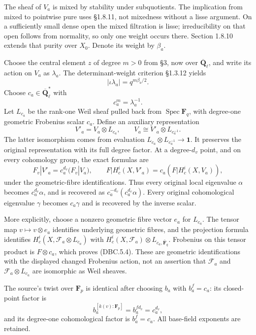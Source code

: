 \documentclass[
]{report}
\begin{document}
The sheaf of \(V_a\) is mixed by stability under subquotients. The
implication from mixed to pointwise pure uses §1.8.11, not mixedness
without a lisse argument. On a sufficiently small dense open the mixed
filtration is lisse; irreducibility on that open follows from normality,
so only one weight occurs there. Section 1.8.10 extends that purity over
\(X_0\). Denote its weight by \(\beta_a\).

Choose the central element \(z\) of degree \(m>0\) from §3, now over
\(\overline{\mathbf Q}_\ell\), and write its action on \(V_a\) as
\(\lambda_a\). The determinant-weight criterion §1.3.12 yields \[
|\iota\lambda_a|=q^{m\beta_a/2}.
\tag{DBC.5.1}
\] Choose \(c_a\in\overline{\mathbf Q}_\ell^*\) with \[
c_a^m=\lambda_a^{-1}.
\tag{DBC.5.2}
\] Let \(L_{c_a}\) be the rank-one Weil sheaf pulled back from
\(\operatorname{Spec}\mathbf F_q\), with degree-one geometric Frobenius
scalar \(c_a\). Define an auxiliary representation \[
V'_a=V_a\otimes L_{c_a},\qquad
V_a\cong V'_a\otimes L_{c_a^{-1}}.
\tag{DBC.5.3}
\] The latter isomorphism comes from evaluation
\(L_{c_a}\otimes L_{c_a^{-1}}\to\mathbf1\). It preserves the original
representation with its full degree factor. At a degree-\(d_v\) point,
and on every cohomology group, the exact formulas are \[
F_v|V'_a=c_a^{d_v}(F_v|V_a),\qquad
F|H_c^i(X,V'_a)=c_a(F|H_c^i(X,V_a)),
\tag{DBC.5.4}
\] under the geometric-fibre identifications. Thus every original local
eigenvalue \(\alpha\) becomes \(c_a^{d_v}\alpha\), and is recovered as
\(c_a^{-d_v}(c_a^{d_v}\alpha)\). Every original cohomological eigenvalue
\(\gamma\) becomes \(c_a\gamma\) and is recovered by the inverse scalar.

More explicitly, choose a nonzero geometric fibre vector \(e_a\) for
\(L_{c_a}\). The tensor map \(v\mapsto v\otimes e_a\) identifies
underlying geometric fibres, and the projection formula identifies
\(H_c^i(X,\mathcal F_a\otimes L_{c_a})\) with
\(H_c^i(X,\mathcal F_a)\otimes L_{c_a,\bar{\mathbf F}_q}\). Frobenius on
this tensor product is \(F\otimes c_a\), which proves (DBC.5.4). These
are geometric identifications with the displayed changed Frobenius
action, not an assertion that \(\mathcal F_a\) and
\(\mathcal F_a\otimes L_{c_a}\) are isomorphic as Weil sheaves.

The source's twist over \(\mathbf F_p\) is identical after choosing
\(b_a\) with \(b_a^f=c_a\): its closed-point factor is \[
b_a^{[k(v):\mathbf F_p]}=b_a^{f d_v}=c_a^{d_v},
\tag{DBC.5.5}
\] and its degree-one cohomological factor is \(b_a^f=c_a\). All
base-field exponents are retained.
\end{document}
